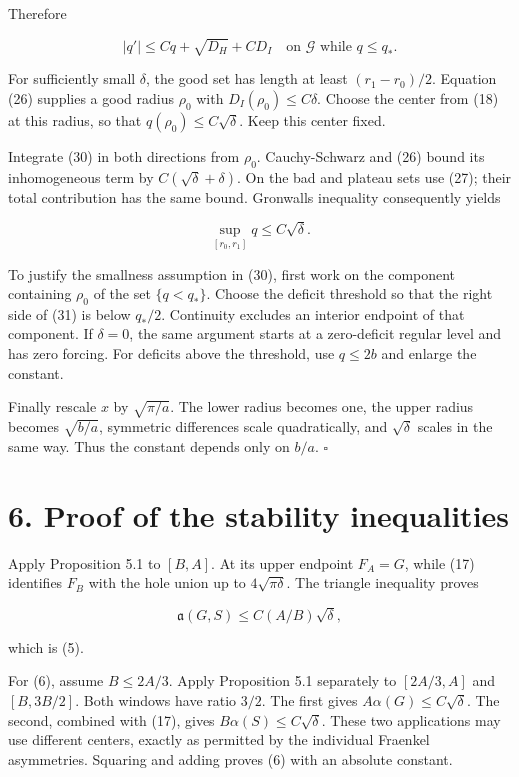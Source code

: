 \documentclass[11pt]{article}
\begin{document}
Therefore

\[
|q'|\le Cq+\sqrt{D_H}+CD_I
\quad\text{on }\mathcal G\text{ while }q\le q_*.
\tag{30}
\]

For sufficiently small \(\delta\), the good set has length at least
\((r_1-r_0)/2\). Equation (26) supplies a good radius \(\rho_0\) with
\(D_I(\rho_0)\le C\delta\). Choose the center from (18) at this radius,
so that \(q(\rho_0)\le C\sqrt\delta\). Keep this center fixed.

Integrate (30) in both directions from \(\rho_0\). Cauchy-Schwarz and
(26) bound its inhomogeneous term by \(C(\sqrt\delta+\delta)\). On the
bad and plateau sets use (27); their total contribution has the same
bound. Gronwall\textquotesingle s inequality consequently yields

\[
\sup_{[r_0,r_1]}q\le C\sqrt\delta.
\tag{31}
\]

To justify the smallness assumption in (30), first work on the component
containing \(\rho_0\) of the set \(\{q<q_*\}\). Choose the deficit
threshold so that the right side of (31) is below \(q_*/2\). Continuity
excludes an interior endpoint of that component. If \(\delta=0\), the
same argument starts at a zero-deficit regular level and has zero
forcing. For deficits above the threshold, use \(q\le2b\) and enlarge
the constant.

Finally rescale \(x\) by \(\sqrt{\pi/a}\). The lower radius becomes one,
the upper radius becomes \(\sqrt{b/a}\), symmetric differences scale
quadratically, and \(\sqrt\delta\) scales in the same way. Thus the
constant depends only on \(b/a\). \(\square\)

\section{6. Proof of the stability
inequalities}\label{proof-of-the-stability-inequalities}

Apply Proposition 5.1 to \([B,A]\). At its upper endpoint \(F_A=G\),
while (17) identifies \(F_B\) with the hole union up to
\(4\sqrt{\pi\delta}\). The triangle inequality proves

\[
\mathfrak a(G,S)\le C(A/B)\sqrt\delta,
\]

which is (5).

For (6), assume \(B\le2A/3\). Apply Proposition 5.1 separately to
\([2A/3,A]\) and \([B,3B/2]\). Both windows have ratio \(3/2\). The
first gives \(A\alpha(G)\le C\sqrt\delta\). The second, combined with
(17), gives \(B\alpha(S)\le C\sqrt\delta\). These two applications may
use different centers, exactly as permitted by the individual Fraenkel
asymmetries. Squaring and adding proves (6) with an absolute constant.
\end{document}
